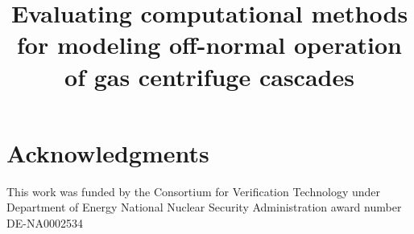 \documentclass[12pt]{paper}
\begin{document}
\title{Evaluating computational methods for modeling off-normal operation of gas centrifuge cascades}


\date{}

\maketitle















\section{Acknowledgments}
This work was funded by the Consortium for Verification Technology under
Department of Energy National Nuclear Security Administration award number
DE-NA0002534



%

\begin{small}

\end{small}
\end{document}
